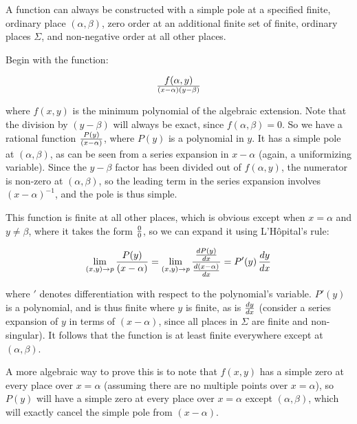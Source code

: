 
\endtheorem

\theorem
\label{simple pole construction}

A function can always be constructed with a simple pole at a specified
finite, ordinary place $(\alpha, \beta)$, zero order at an additional
finite set of finite, ordinary places $\Sigma$, and non-negative order
at all other places.

\proof

Begin with the function:

$$f(\alpha,y)\over(x-\alpha)(y-\beta)$$

where $f(x,y)$ is the minimum polynomial of the algebraic extension.
Note that the division by $(y-\beta)$ will always be exact, since
$f(\alpha, \beta)=0$.  So we have a rational function
$P(y)\over(x-\alpha)$, where $P(y)$ is a polynomial in $y$.  It has a
simple pole at $(\alpha, \beta)$, as can be seen from a series
expansion in $x-\alpha$ (again, a uniformizing variable).  Since the
$y-\beta$ factor has been divided out of $f(\alpha,y)$, the numerator
is non-zero at $(\alpha, \beta)$, so the leading term in the series
expansion involves $(x-\alpha)^{-1}$, and the pole is thus simple.

This function is finite at all other places, which is obvious except
when $x=\alpha$ and $y\ne\beta$, where it takes the form $0\over0$,
so we can expand it using L'H\^opital's rule:

$$\lim_{(x,y)\to p} {{P(y)}\over(x-\alpha)}
  = \lim_{{(x,y)\to p}} {{{dP(y)}\over{dx}}\over{{d(x-\alpha)}\over{dx}}}
  = P'(y) \, {{dy}\over{dx}} $$

where $'$ denotes differentiation with respect to the polynomial's
variable.  $P'(y)$ is a polynomial, and is thus finite where $y$ is
finite, as is ${dy}\over{dx}$ (consider a series expansion of $y$ in
terms of $(x-\alpha)$, since all places in $\Sigma$ are finite and
non-singular).  It follows that the function is at least finite
everywhere except at $(\alpha, \beta)$.

A more algebraic way to prove this is to note that
$f(x,y)$ has a simple zero at every place over $x=\alpha$ (assuming
there are no multiple points over $x=\alpha$), so $P(y)$ will have a
simple zero at every place over $x=\alpha$ except $(\alpha, \beta)$,
which will exactly cancel the simple pole from $(x-\alpha)$.

